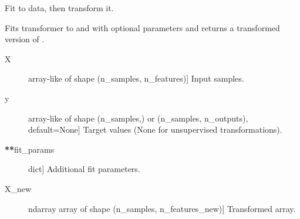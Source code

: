 \documentclass[letterpaper,10pt,english]{sphinxmanual}
\begin{document}
\begin{fulllineitems}
\begin{fulllineitems}
\label{\detokenize{api/mastml.preprocessing.BasePreprocessor:mastml.preprocessing.BasePreprocessor.evaluate}}
\end{fulllineitems}


\begin{fulllineitems}
\label{\detokenize{api/mastml.preprocessing.BasePreprocessor:mastml.preprocessing.BasePreprocessor.fit}}
\end{fulllineitems}


\begin{fulllineitems}
\label{\detokenize{api/mastml.preprocessing.BasePreprocessor:mastml.preprocessing.BasePreprocessor.fit_transform}}
Fit to data, then transform it.

Fits transformer to  and  with optional parameters 
and returns a transformed version of .
\begin{description}
\item[{X}] \leavevmode{[}array-like of shape (n\_samples, n\_features){]}
Input samples.

\item[{y}] \leavevmode{[}array-like of shape (n\_samples,) or (n\_samples, n\_outputs),                 default=None{]}
Target values (None for unsupervised transformations).

\item[{{\color{red}\bfseries{}**}fit\_params}] \leavevmode{[}dict{]}
Additional fit parameters.

\end{description}
\begin{description}
\item[{X\_new}] \leavevmode{[}ndarray array of shape (n\_samples, n\_features\_new){]}
Transformed array.


\end{description}
\end{fulllineitems}
\end{fulllineitems}
\end{document}
